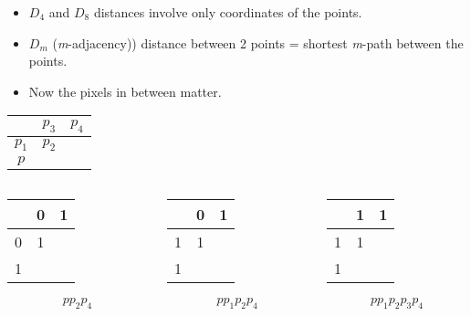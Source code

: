 \begin{frame}
\begin{itemize}
\item $D_{4}$ and $D_{8}$ distances involve only coordinates of the points.
\item $D_{m}$ (\textit{m}-adjacency)) distance between 2 points = shortest \textit{m}-path between the points.
\item Now the pixels in between matter.
\end{itemize}
\begin{table}
\centering
\begin{tabular}{|c|c|c|}
\hline 
 & $p_3$ & $p_4$ \\ 
\hline 
$p_1$ & $p_2$ &  \\ 
\hline 
$p$ &   &   \\ 
\hline 
\end{tabular}
\end{table}
\begin{columns}
\begin{column}{.3\textwidth}
\begin{table}
\centering
\begin{tabular}{|c|c|c|}
\hline 
 & 0 & 1 \\ 
\hline 
0 & 1 &  \\ 
\hline 
1 &   &   \\ 
\hline 
\end{tabular}
\end{table}
\[pp_{2}p_{4}\]
\end{column}
\begin{column}{.3\textwidth}
\begin{table}
\centering
\begin{tabular}{|c|c|c|}
\hline 
 & 0 & 1 \\ 
\hline 
1 & 1 &  \\ 
\hline 
1 &   &   \\ 
\hline 
\end{tabular}
\end{table}
\[pp_{1}p_{2}p_{4}\]
\end{column}
\begin{column}{.3\textwidth}
\begin{table}
\centering
\begin{tabular}{|c|c|c|}
\hline 
 & 1 & 1 \\ 
\hline 
1 & 1 &  \\ 
\hline 
1 &   &   \\ 
\hline 
\end{tabular}
\end{table}
\[pp_{1}p_{2}p_{3}p_{4}\]
\end{column}
\end{columns}
\end{frame}

